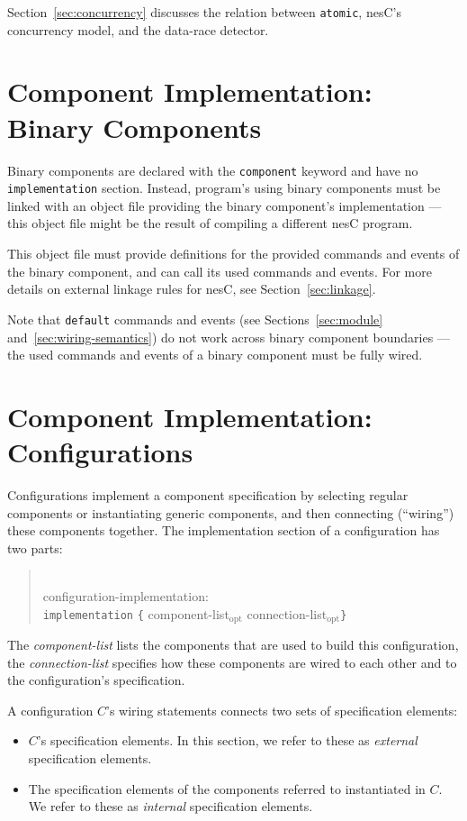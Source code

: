 \documentclass[11pt,letterpaper]{article}
\newcommand{\kw}[1]{{\tt #1}}
\newcommand{\nesc}{nesC\xspace}
\newcommand{\opt}{$_{\mbox{opt}}$\xspace}
\newcommand{\grammarshift}{\vspace*{-.7cm}}
\newcommand{\grammarindent}{\hspace*{2cm}\= \\ \kill}
\begin{document}
Section~\ref{sec:concurrency} discusses the relation between \kw{atomic}, 
\nesc's concurrency model, and the data-race detector.

\section{Component Implementation: Binary Components}
\label{sec:binary}

Binary components are declared with the \kw{component} keyword and
have no \kw{implementation} section. Instead, program's using binary
components must be linked with an object file providing the binary
component's implementation --- this object file might be the result
of compiling a different \nesc program.

This object file must provide definitions for the provided commands
and events of the binary component, and can call its used commands
and events. For more details on external linkage rules for \nesc,
see Section~\ref{sec:linkage}.

Note that \kw{default} commands and events (see Sections~\ref{sec:module}
and~\ref{sec:wiring-semantics}) do not work across binary component
boundaries --- the used commands and events of a binary component must
be fully wired.

\section{Component Implementation: Configurations}
\label{sec:configuration}

Configurations implement a component specification by selecting regular
components or instantiating generic components, and then connecting
(``wiring'') these components together. The implementation section of
a configuration has two parts:
\begin{quote} \grammarshift \em \begin{tabbing}
\grammarindent
configuration-implementation:\\
\>	\kw{implementation} \kw{\{} component-list\opt connection-list\opt \kw{\}}\\
\end{tabbing} \end{quote}
The \emph{component-list} lists the components that are used to build this
configuration, the \emph{connection-list} specifies how these components
are wired to each other and to the configuration's specification.

A configuration $C$'s wiring statements connects two sets of specification
elements:
\begin{itemize}
\item $C$'s specification elements. In this section, we refer to these as
\emph{external} specification elements.
\item The specification elements of the components referred to instantiated
in $C$. We refer to these as \emph{internal} specification elements.
\end{itemize}
\end{document}
